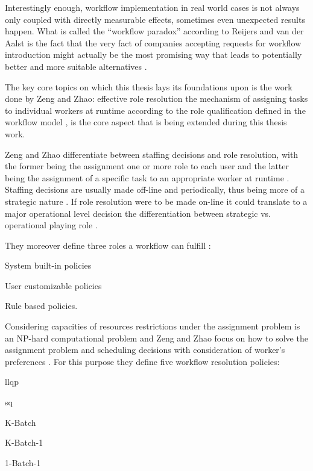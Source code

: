 \documentclass{seal_thesis}
\begin{document}
Interestingly enough, workflow implementation in real world cases is not always only coupled with directly measurable effects, sometimes even unexpected results happen. What is called the ``workflow paradox'' according to Reijers and van der Aalst is the fact that the very fact of companies accepting requests for workflow introduction might actually be the most promising way that leads to potentially better and more suitable alternatives \cite{Reijers2005}.

The key core topics on which this thesis lays its foundations upon is the work done by Zeng and Zhao: effective role resolution \ie the mechanism of assigning tasks to individual workers at runtime according to the role qualification defined in the workflow model \cite{Zeng2005}, is the core aspect that is being extended during this thesis work.

Zeng and Zhao differentiate between staffing decisions and role resolution, with the former being the assignment one or more role to each user and the latter being the assignment of a specific task to an appropriate worker at runtime \cite{Zeng2005}. Staffing decisions are usually made off-line and periodically, thus being more of a strategic nature \cite{Zeng2005}. If role resolution were to be made on-line it could translate to a major operational level decision \ie the differentiation between strategic vs. operational playing role \cite{Zeng2005}.

They moreover define three roles a workflow can fulfill \cite{Zeng2005}:
\begin{enumerate*}
	\item System built-in policies
	\item User customizable policies
	\item Rule based policies.
\end{enumerate*}

Considering capacities of resources restrictions under the assignment problem is an NP-hard computational problem and Zeng and Zhao focus on how to solve the assignment problem and scheduling decisions with consideration of worker's preferences \cite{Zeng2005}. For this purpose they define five workflow resolution policies:
\begin{enumerate*}
	\item \gls{llqp}
	\item \gls{sq}
	\item K-Batch
	\item K-Batch-1
	\item 1-Batch-1
\end{enumerate*}
\end{document}
